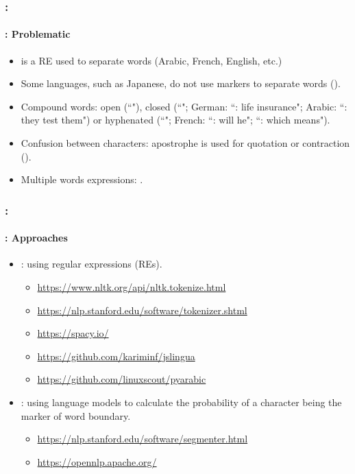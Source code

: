 \documentclass[xcolor=table]{beamer}
\begin{document}
\begin{frame}
	\frametitle{\insertshortsubtitle: \insertsection}
	\framesubtitle{\insertsubsection: Problematic} 

	\begin{itemize}
		\item \expword{/[ ]+/} is a RE used to separate words (Arabic, French, English, etc.)
		\item Some languages, such as Japanese, do not use markers to separate words ().
		\item Compound words: open (``"), closed (``"; German: ``: life insurance"; Arabic: ``: they test them") or hyphenated (``"; French: ``: will he"; ``: which means").
		\item Confusion between characters: apostrophe is used for quotation or contraction ().
		\item Multiple words expressions: .
	\end{itemize}

\end{frame}

\begin{frame}
	\frametitle{\insertshortsubtitle: \insertsection}
	\framesubtitle{\insertsubsection: Approaches}

	\begin{itemize}
		\item {}: using regular expressions (REs).
		\begin{itemize}
			\item \url{https://www.nltk.org/api/nltk.tokenize.html}
			\item \url{https://nlp.stanford.edu/software/tokenizer.shtml}
			\item \url{https://spacy.io/}
			\item \url{https://github.com/kariminf/jslingua}
			\item \url{https://github.com/linuxscout/pyarabic}
		\end{itemize}
		\item {}: using language models to calculate the probability of a character being the marker of word boundary.
		\begin{itemize}
			\item \url{https://nlp.stanford.edu/software/segmenter.html}
			\item \url{https://opennlp.apache.org/}
		\end{itemize}
	\end{itemize}

\end{frame}
\end{document}
